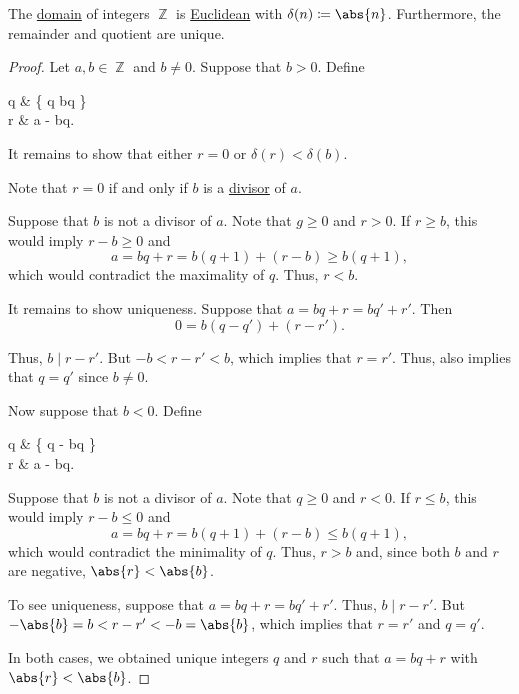 \begin{proposition}\label{thm:integers_are_euclidean_domain}
  The \hyperref[def:semiring/integral_domain]{domain} of integers \( \BbbZ \) is \hyperref[def:semiring/euclidean_domain]{Euclidean} with \( \delta(n) \coloneqq \abs{n} \). Furthermore, the remainder and quotient are unique.
\end{proposition}
\begin{proof}
  Let \( a, b \in \BbbZ \) and \( b \neq 0 \). Suppose that \( b > 0 \). Define
  \begin{balign*}
    q & \coloneqq \max \{ q \in \BbbZ \colon bq \leq {} \} \\
    r & \coloneqq a - bq.
  \end{balign*}

  It remains to show that either \( r = 0 \) or \( \delta(r) < \delta(b) \).

  Note that \( r = 0 \) if and only if \( b \) is a \hyperref[def:semiring_division]{divisor} of \( a \).

  Suppose that \( b \) is not a divisor of \( a \). Note that \( g \geq 0 \) and \( r > 0 \). If \( r \geq b \), this would imply \( r - b \geq 0 \) and
  \begin{equation*}
    a = bq + r = b(q + 1) + (r - b) \geq b(q + 1),
  \end{equation*}
  which would contradict the maximality of \( q \). Thus, \( r < b \).

  It remains to show uniqueness. Suppose that \( a = bq + r = bq' + r' \). Then
  \begin{equation*}
    0 = b(q - q') + (r - r').
  \end{equation*}

  Thus, \( b \mid r - r' \). But \( -b < r - r' < b \), which implies that \( r = r' \). Thus, also implies that \( q = q' \) since \( b \neq 0 \).

  Now suppose that \( b < 0 \). Define
  \begin{balign*}
    q & \coloneqq \min \{ q \in \BbbZ \colon - \leq bq \} \\
    r & \coloneqq a - bq.
  \end{balign*}

  Suppose that \( b \) is not a divisor of \( a \). Note that \( q \geq 0 \) and \( r < 0 \). If \( r \leq b \), this would imply \( r - b \leq 0 \) and
  \begin{equation*}
    a = bq + r = b(q + 1) + (r - b) \leq b(q + 1),
  \end{equation*}
  which would contradict the minimality of \( q \). Thus, \( r > b \) and, since both \( b \) and \( r \) are negative, \( \abs{r} < \abs{b} \).

  To see uniqueness, suppose that \( a = bq + r = bq' + r' \). Thus, \( b \mid r - r' \). But \( -\abs{b} = b < r - r' < -b = \abs{b} \), which implies that \( r = r' \) and \( q = q' \).

  In both cases, we obtained unique integers \( q \) and \( r \) such that \( a = bq + r \) with \( \abs{r} < \abs{b} \).
\end{proof}

